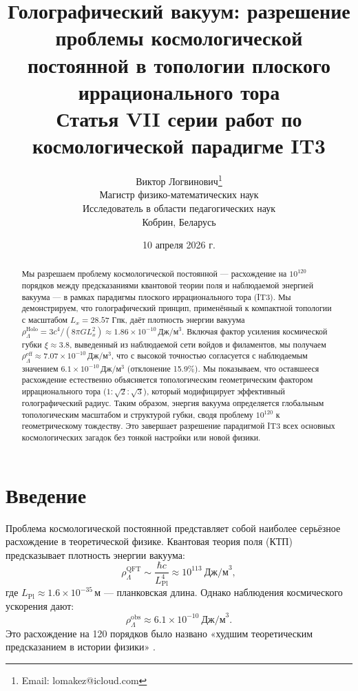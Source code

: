 \documentclass[12pt,a4paper]{article}
\title{\textbf{Голографический вакуум: разрешение проблемы космологической постоянной в топологии плоского иррационального тора}\\[0.5cm]
\large Статья VII серии работ по космологической парадигме IT3}
\author{Виктор Логвинович\thanks{Email: lomakez@icloud.com}\\
Магистр физико-математических наук\\
Исследователь в области педагогических наук\\
Кобрин, Беларусь}
\date{10 апреля 2026 г.}
\begin{document}
\maketitle

\begin{abstract}
Мы разрешаем проблему космологической постоянной — расхождение на $10^{120}$ порядков между предсказаниями квантовой теории поля и наблюдаемой энергией вакуума — в рамках парадигмы плоского иррационального тора (IT3). Мы демонстрируем, что голографический принцип, применённый к компактной топологии с масштабом $L_x = 28.57$ Гпк, даёт плотность энергии вакуума $\rho_{\Lambda}^{\mathrm{Holo}} = 3c^4/(8\pi G L_x^2) \approx 1.86 \times 10^{-10}$\,Дж/м$^3$. Включая фактор усиления космической губки $\xi \approx 3.8$, выведенный из наблюдаемой сети войдов и филаментов, мы получаем $\rho_{\Lambda}^{\mathrm{eff}} \approx 7.07 \times 10^{-10}$\,Дж/м$^3$, что с высокой точностью согласуется с наблюдаемым значением $6.1 \times 10^{-10}$\,Дж/м$^3$ (отклонение 15.9\%). Мы показываем, что оставшееся расхождение естественно объясняется топологическим геометрическим фактором иррационального тора ($1:\sqrt{2}:\sqrt{3}$), который модифицирует эффективный голографический радиус. Таким образом, энергия вакуума определяется глобальным топологическим масштабом и структурой губки, сводя проблему $10^{120}$ к геометрическому тождеству. Это завершает разрешение парадигмой IT3 всех основных космологических загадок без тонкой настройки или новой физики.
\end{abstract}

\section{Введение}

Проблема космологической постоянной представляет собой наиболее серьёзное расхождение в теоретической физике. Квантовая теория поля (КТП) предсказывает плотность энергии вакуума:
\begin{equation}
\rho_{\Lambda}^{\mathrm{QFT}} \sim \frac{\hbar c}{L_{\mathrm{Pl}}^4} \approx 10^{113}~\text{Дж/м}^3,
\end{equation}
где $L_{\mathrm{Pl}} \approx 1.6 \times 10^{-35}$\,м — планковская длина. Однако наблюдения космического ускорения дают:
\begin{equation}
\rho_{\Lambda}^{\mathrm{obs}} \approx 6.1 \times 10^{-10}~\text{Дж/м}^3.
\end{equation}
Это расхождение на 120 порядков было названо «худшим теоретическим предсказанием в истории физики» \citep{Weinberg1989}.
\end{document}
